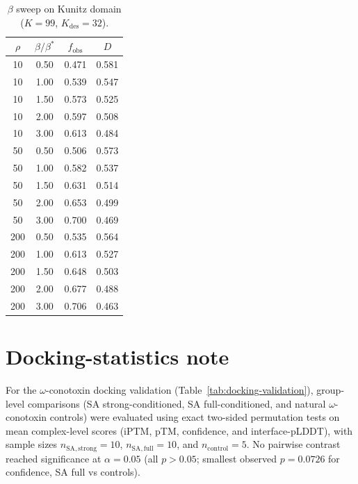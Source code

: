 \begin{table}[ht]
  \centering
  \caption{$\beta$ sweep on Kunitz domain ($K=99$, $K_{\mathrm{des}}=32$).}
  \label{tab:beta-sweep}
  \small
  \begin{tabular}{cccc}
    \toprule
    $\rho$ & $\beta/\beta^{*}$ & $f_{\mathrm{obs}}$ & $D$ \\
    \midrule
    10  & 0.50 & 0.471 & 0.581 \\
    10  & 1.00 & 0.539 & 0.547 \\
    10  & 1.50 & 0.573 & 0.525 \\
    10  & 2.00 & 0.597 & 0.508 \\
    10  & 3.00 & 0.613 & 0.484 \\
    \midrule
    50  & 0.50 & 0.506 & 0.573 \\
    50  & 1.00 & 0.582 & 0.537 \\
    50  & 1.50 & 0.631 & 0.514 \\
    50  & 2.00 & 0.653 & 0.499 \\
    50  & 3.00 & 0.700 & 0.469 \\
    \midrule
    200 & 0.50 & 0.535 & 0.564 \\
    200 & 1.00 & 0.613 & 0.527 \\
    200 & 1.50 & 0.648 & 0.503 \\
    200 & 2.00 & 0.677 & 0.488 \\
    200 & 3.00 & 0.706 & 0.463 \\
  \bottomrule
  \end{tabular}
\end{table}

\section*{Docking-statistics note}
For the $\omega$-conotoxin docking validation (Table~\ref{tab:docking-validation}),
group-level comparisons (SA strong-conditioned, SA full-conditioned, and
natural $\omega$-conotoxin controls) were evaluated using exact two-sided
permutation tests on mean complex-level scores (iPTM, pTM, confidence, and
interface-pLDDT), with sample sizes $n_{\mathrm{SA,strong}}=10$,
$n_{\mathrm{SA,full}}=10$, and $n_{\mathrm{control}}=5$. No pairwise
contrast reached significance at $\alpha=0.05$ (all $p > 0.05$; smallest observed
$p=0.0726$ for confidence, SA full vs controls).

